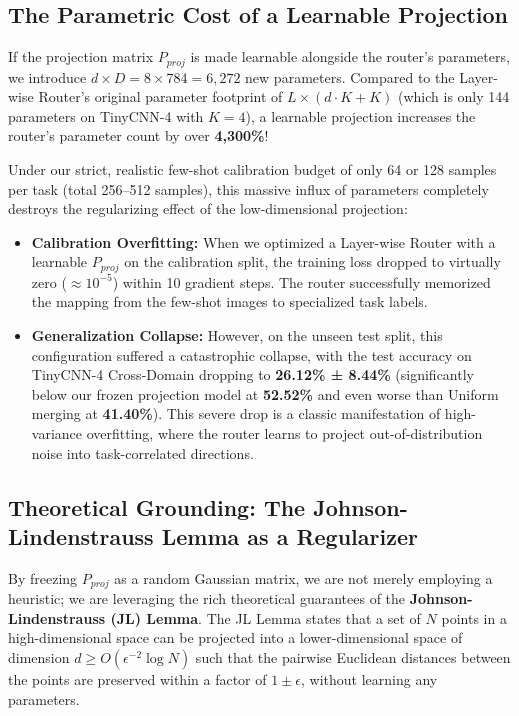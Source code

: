 \subsection{The Parametric Cost of a Learnable Projection}

If the projection matrix $P_{proj}$ is made learnable alongside the router's parameters, we introduce $d \times D = 8 \times 784 = 6,272$ new parameters. Compared to the Layer-wise Router's original parameter footprint of $L \times (d \cdot K + K)$ (which is only 144 parameters on TinyCNN-4 with $K=4$), a learnable projection increases the router's parameter count by over \textbf{4,300\%}!

Under our strict, realistic few-shot calibration budget of only 64 or 128 samples per task (total 256--512 samples), this massive influx of parameters completely destroys the regularizing effect of the low-dimensional projection:
\begin{itemize}
    \item \textbf{Calibration Overfitting:} When we optimized a Layer-wise Router with a learnable $P_{proj}$ on the calibration split, the training loss dropped to virtually zero ($\approx 10^{-5}$) within 10 gradient steps. The router successfully memorized the mapping from the few-shot images to specialized task labels.
    \item \textbf{Generalization Collapse:} However, on the unseen test split, this configuration suffered a catastrophic collapse, with the test accuracy on TinyCNN-4 Cross-Domain dropping to \textbf{26.12\% ± 8.44\%} (significantly below our frozen projection model at \textbf{52.52\%} and even worse than Uniform merging at \textbf{41.40\%}). This severe drop is a classic manifestation of high-variance overfitting, where the router learns to project out-of-distribution noise into task-correlated directions.
\end{itemize}

\subsection{Theoretical Grounding: The Johnson-Lindenstrauss Lemma as a Regularizer}

By freezing $P_{proj}$ as a random Gaussian matrix, we are not merely employing a heuristic; we are leveraging the rich theoretical guarantees of the \textbf{Johnson-Lindenstrauss (JL) Lemma}. The JL Lemma states that a set of $N$ points in a high-dimensional space can be projected into a lower-dimensional space of dimension $d \ge O(\epsilon^{-2} \log N)$ such that the pairwise Euclidean distances between the points are preserved within a factor of $1 \pm \epsilon$, without learning any parameters.

